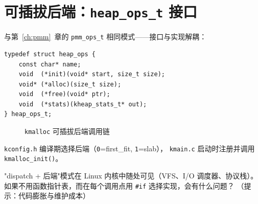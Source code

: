 \section{可插拔后端：\texttt{heap\_ops\_t} 接口}

与第~\ref{ch:pmm}~章的 \texttt{pmm\_ops\_t} 相同模式——接口与实现解耦：

\begin{lstlisting}[style=cstyle]
typedef struct heap_ops {
    const char* name;
    void  (*init)(void* start, size_t size);
    void* (*alloc)(size_t size);
    void  (*free)(void* ptr);
    void  (*stats)(kheap_stats_t* out);
} heap_ops_t;
\end{lstlisting}

\begin{figure}[H]
  \centering
  
  \caption{\texttt{kmalloc} 可插拔后端调用链}
  \label{fig:kmalloc-dispatch}
\end{figure}

\texttt{kconfig.h} 编译期选择后端（\texttt{0}=first\_fit, \texttt{1}=slab），
\texttt{kmain.c} 启动时注册并调用 \texttt{kmalloc\_init()}。

\begin{thinkbox}
"dispatch + 后端"模式在 Linux 内核中随处可见（VFS、I/O 调度器、协议栈）。
如果不用函数指针表，而在每个调用点用 \texttt{\#if} 选择实现，会有什么问题？
（提示：代码膨胀与维护成本）
\end{thinkbox}



